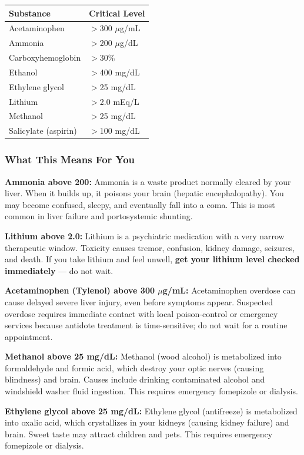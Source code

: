 \begin{longtable}{@{}ll@{}}
\toprule
\textbf{Substance} & \textbf{Critical Level} \\
\midrule
Acetaminophen & $>$300 $\mu$g/mL \\
Ammonia & $>$200 $\mu$g/dL \\
Carboxyhemoglobin & $>$30\% \\
Ethanol & $>$400 mg/dL \\
Ethylene glycol & $>$25 mg/dL \\
Lithium & $>$2.0 mEq/L \\
Methanol & $>$25 mg/dL \\
Salicylate (aspirin) & $>$100 mg/dL \\
\bottomrule
\end{longtable}

\subsubsection{What This Means For You}

\textbf{Ammonia above 200:} Ammonia is a waste product normally cleared by your liver. When it builds up, it poisons your brain (hepatic encephalopathy). You may become confused, sleepy, and eventually fall into a coma. This is most common in liver failure and portosystemic shunting.

\textbf{Lithium above 2.0:} Lithium is a psychiatric medication with a very narrow therapeutic window. Toxicity causes tremor, confusion, kidney damage, seizures, and death. If you take lithium and feel unwell, \textbf{get your lithium level checked immediately} --- do not wait.

\textbf{Acetaminophen (Tylenol) above 300 $\mu$g/mL:} Acetaminophen overdose can cause delayed severe liver injury, even before symptoms appear. Suspected overdose requires immediate contact with local poison-control or emergency services because antidote treatment is time-sensitive; do not wait for a routine appointment.

\textbf{Methanol above 25 mg/dL:} Methanol (wood alcohol) is metabolized into formaldehyde and formic acid, which destroy your optic nerves (causing blindness) and brain. Causes include drinking contaminated alcohol and windshield washer fluid ingestion. This requires emergency fomepizole or dialysis.

\textbf{Ethylene glycol above 25 mg/dL:} Ethylene glycol (antifreeze) is metabolized into oxalic acid, which crystallizes in your kidneys (causing kidney failure) and brain. Sweet taste may attract children and pets. This requires emergency fomepizole or dialysis.

